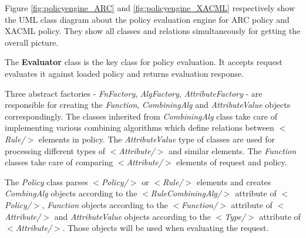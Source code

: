 \documentclass{article}                            %
\begin{document}
\begin{figure}[ht]
\end{figure}

Figure \ref{fig:policyengine_ARC} and \ref{fig:policyengine_XACML} respectively show the UML class diagram about the policy evaluation engine for ARC policy and XACML policy. They show all classes and relations simultaneously for getting the overall picture.


The \textbf{Evaluator} class is the key class for policy evaluation. It accepts request evaluates it against loaded policy and returns evaluation response.

Three abstract factories - \textit{FnFactory}, \textit{AlgFactory}, \textit{AttributeFactory} - are responsible for creating the \textit{Function}, \textit{CombiningAlg} and \textit{AttributeValue} objects correspondingly. The classes inherited from \textit{CombiningAlg} class take care of implementing various combining algorithms which define relations between \textit{$<$Rule/$>$} elements in policy. The \textit{AttributeValue} type of classes are used for processing different types of \textit{$<$Attribute/$>$} and similar elements. The \textit{Function} classes take care of comparing \textit{$<$Attribute/$>$} elements of request and policy.

The \textit{Policy} class parses \textit{$<$Policy/$>$} or \textit{$<$Rule/$>$} elements and creates \textit{CombingAlg} objects according to the \textit{$<$RuleCombiningAlg/$>$} attribute of \textit{$<$Policy/$>$}, \textit{Function} objects according to the \textit{$<$Function/$>$} attribute of \textit{$<$Attribute/$>$} and \textit{AttributeValue} objects according to the \textit{$<$Type/$>$} attribute of \textit{$<$Attribute/$>$}. Those objects will be used when evaluating the request.
\end{document}
